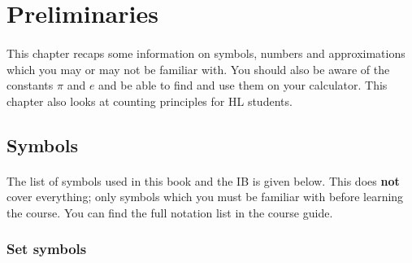 \documentclass[12pt, a4paper, titlepage, twoside]{article}
\begin{document}
	\newpage
	
\section{Preliminaries}	

	\paragraph{}
	This chapter recaps some information on symbols, numbers and approximations which you may or may not be familiar with.
	You should also be aware of the constants $\pi$ and $e$ and be able to find and use them on your calculator. This chapter
	also looks at counting principles for HL students.
	
	\subsection{Symbols}
	
	\paragraph{}
	The list of symbols used in this book and the IB is given below. This does \textbf{not} cover everything; only symbols
	which you must be familiar with before learning the course. You can find the full notation list in the course guide.
	
	{\centering \subsubsection*{Set symbols}}
	
\end{document}
